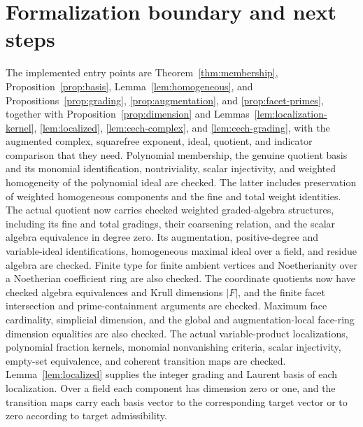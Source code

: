 \section{Formalization boundary and next steps}
The implemented entry points are Theorem~\ref{thm:membership},
Proposition~\ref{prop:basis}, Lemma~\ref{lem:homogeneous}, and
Propositions~\ref{prop:grading}, \ref{prop:augmentation}, and
\ref{prop:facet-primes}, together with Proposition~\ref{prop:dimension}
and Lemmas~\ref{lem:localization-kernel}, \ref{lem:localized},
\ref{lem:cech-complex}, and \ref{lem:cech-grading}, with the
augmented complex, squarefree exponent, ideal, quotient, and indicator
comparison that they need. Polynomial membership, the genuine quotient
basis and its monomial identification, nontriviality, scalar injectivity,
and weighted homogeneity of the polynomial ideal are checked. The latter
includes preservation of weighted homogeneous components and the fine
and total weight identities. The actual quotient now carries checked
weighted graded-algebra structures, including its fine and total gradings,
their coarsening relation, and the scalar algebra equivalence in degree
zero. Its augmentation, positive-degree and variable-ideal identifications,
homogeneous maximal ideal over a field, and residue algebra are checked.
Finite type for finite ambient vertices and Noetherianity over a Noetherian
coefficient ring are also checked. The coordinate quotients now have checked
algebra equivalences and Krull dimensions $|F|$, and the finite facet
intersection and prime-containment arguments are checked. Maximum face
cardinality, simplicial dimension, and the global and augmentation-local
face-ring dimension equalities are also checked. The actual variable-product
localizations, polynomial fraction kernels, monomial nonvanishing criteria,
scalar injectivity, empty-set equivalence, and coherent transition maps are
checked. Lemma~\ref{lem:localized} supplies the integer grading and Laurent
basis of each localization. Over a field each component has dimension zero
or one, and the transition maps carry each basis vector to the corresponding
target vector or to zero according to target admissibility.

